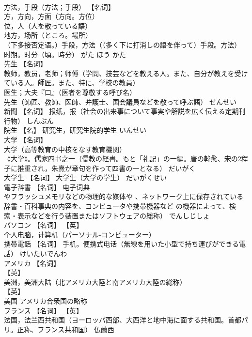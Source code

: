 \documentclass[8pt]{extreport}
\begin{document}
\begin{CJK}{UTF8}{min}
\\	方法，手段（方法；手段） 【名词】 
\\	方，方向，方面（方向。方位） 
\\	位，人（人を敬っている語） 
\\	地方，场所（ところ。場所） 
\\	（下多接否定语。）手段，方法（（多く下に打消しの語を伴って）手段。方法） 
\\	时期。时分（頃。時分）	がた ほう かた	
\\	先生	【名词】 
\\	教师，教员，老师；师傅（学問、技芸などを教える人。また、自分が教えを受けている人。師匠。また、特に、学校の教員） 
\\	医生；大夫『口』（医者を尊敬する呼び名） 
\\	先生（師匠、教師、医師、弁護士、国会議員などを敬って呼ぶ語）	せんせい	
\\	新聞	【名词】 报纸，报（社会の出来事について事実や解説を広く伝える定期刊行物）	しんぶん	
\\	院生	【名】 研究生，研究生院的学生	いんせい	
\\	大学	【名词】 
\\	大学（高等教育の中核をなす教育機関） 
\\	《大学》。儒家四书之一（儒教の経書。もと「礼記」の一編。唐の韓愈、宋の2程子に推重され，朱熹が章句を作って四書の一となる）	だいがく	
\\	大学生	【名词】 大学生（大学の学生）	だいがくせい	
\\	電子辞書	【名词】 电子词典
\\	やフラッシュメモリなどの物理的な媒体や 、ネットワーク上に保存されている辞書・百科事典の内容を、コンピュータや携帯機器など の機器によって、検索・表示などを行う装置またはソフトウェアの総称）	でんしじしょ	
\\	パソコン	【名词】 【英】
\\	个人电脑，计算机（パーソナル-コンピューター）		
\\	携帯電話	【名词】 手机。便携式电话（無線を用いた小型で持ち運びができる電話）	けいたいでんわ	
\\	アメリカ	【名词】 
\\	【英】
\\	美洲，美洲大陆（北アメリカ大陸と南アメリカ大陸の総称） 
\\	【英】
\\	美国		アメリカ合衆国の略称
\\	フランス	【名词】 【英】
\\	法国，法兰西共和国（ヨーロッパ西部、大西洋と地中海に面する共和国。首都パリ。正称、フランス共和国）		仏蘭西

\end{CJK}
\end{document}
